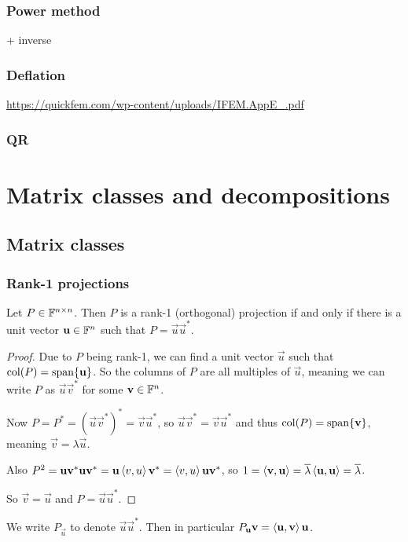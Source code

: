 \subsubsection{Power method}
+ inverse

\subsubsection{Deflation}
\url{https://quickfem.com/wp-content/uploads/IFEM.AppE_.pdf}

\subsubsection{QR}

\section{Matrix classes and decompositions}
\subsection{Matrix classes}
\subsubsection{Rank-1 projections}
\begin{proposition}
Let $P\in\mathbb{F}^{n\times n}$. Then $P$ is a rank-1 (orthogonal) projection \textup{if and only if} there is a unit vector $\boldsymbol{\mathrm{u}}\in\mathbb{F}^n$ such that $P= \vec{u}\vec{u}^*$.
\end{proposition}
\begin{proof}
Due to $P$ being rank-1, we can find a unit vector $\vec{u}$ such that $\operatorname{col}(P) = \operatorname{span}\{\boldsymbol{\mathrm{u}}\}$. So the columns of $P$ are all multiples of $\vec{u}$, meaning we can write $P$ as $\vec{u}\vec{v}^*$ for some $\boldsymbol{\mathrm{v}}\in\mathbb{F}^n$.

Now $P = P^*= (\vec{u}\vec{v}^*)^* = \vec{v}\vec{u}^*$, so $\vec{u}\vec{v}^* = \vec{v}\vec{u}^*$ and thus $\operatorname{col}(P) = \operatorname{span}\{\boldsymbol{\mathrm{v}}\}$, meaning $\vec{v} = \lambda \vec{u}$.

Also $P^2 = \boldsymbol{\mathrm{u}}\boldsymbol{\mathrm{v}}^*\boldsymbol{\mathrm{u}}\boldsymbol{\mathrm{v}}^* = \boldsymbol{\mathrm{u}}\left\langle v,u \right\rangle\boldsymbol{\mathrm{v}}^* = \left\langle v,u \right\rangle\boldsymbol{\mathrm{u}}\boldsymbol{\mathrm{v}}^*$, so $1 = \left\langle \boldsymbol{\mathrm{v}},\boldsymbol{\mathrm{u}} \right\rangle = \overline{\lambda}\left\langle \boldsymbol{\mathrm{u}},\boldsymbol{\mathrm{u}} \right\rangle = \overline{\lambda}$.

So $\vec{v}=\vec{u}$ and $P= \vec{u}\vec{u}^*$.
\end{proof}
We write $P_{\vec{u}}$ to denote $\vec{u}\vec{u}^*$. Then in particular $P_{\boldsymbol{\mathrm{u}}}\boldsymbol{\mathrm{v}} = \left\langle \boldsymbol{\mathrm{u}},\boldsymbol{\mathrm{v}} \right\rangle\boldsymbol{\mathrm{u}}$.

